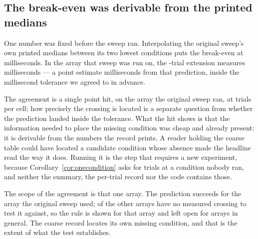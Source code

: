 \subsection{The break-even was derivable from the printed medians}

One number was fixed before the sweep ran. Interpolating the original sweep's
own printed medians between its two lowest conditions puts the break-even at
\PredictedCrossing{} milliseconds. In the array that sweep was run on, the
\NTrials{}-trial extension measures \MeasuredCrossing{} milliseconds --- a
point estimate \PredictionError{} milliseconds from that prediction, inside
the \PredictionTolerance{} millisecond tolerance we agreed to in advance.

The agreement is a single point hit, on the array the original sweep ran, at
\NTrials{} trials per cell; how precisely the crossing is located is a separate
question from whether the prediction landed inside the tolerance. What the hit
shows is that the information needed to place the
missing condition was cheap and already present: it is derivable from the
numbers the record prints. A reader holding the coarse table could have located
a candidate condition whose absence made the headline read the way it does.
Running it is the step that requires a new experiment, because
Corollary~\ref{cor:onecondition} asks for trials at a condition nobody ran, and
neither the summary, the per-trial record nor the code contains those.

The scope of the agreement is that one array. The prediction succeeds for the
array the original sweep used; \CensoredRooms{} of the other arrays have no
measured crossing to test it against, so the rule is shown for that array and
left open for arrays in general. The coarse record locates its own missing
condition, and that is the extent of what the test establishes.

\begin{table}[tbp]
\centering
\caption{Where the ordering between the two estimators changes sign, by array
and by summary rule, over a grid refined inside the interval the original design
skipped. The first pair of columns counts the non-zero dispersions at which the
offset-agnostic estimator holds the lower median error, and gives the highest of
them. A sign change recorded as a bound is one that had not occurred by the top
of the refined grid, which is the lowest non-zero condition the original sweep
ran; the final column names the estimator with the lower median error at exactly
that condition.}
\label{tab:breakeven}
\small

\end{table}

